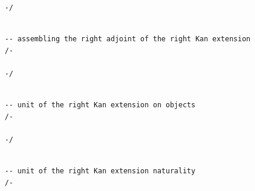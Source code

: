 \documentclass{book}
\theoremstyle{definition}
\newcounter{lcounter}
\begin{document}
{{\begin{center}
\begin{tcolorbox}[width=5in,colback={white},title={\begin{center}\texttt{Lean \thelcounter} \addtocounter{lcounter}{1}  \end{center}},colbacktitle=Blue,coltitle=black]
\begin{verbatim}
-/

\end{verbatim}
\end{tcolorbox}
\end{center}


\begin{center}
\begin{tcolorbox}[width=5in,colback={white},title={\begin{center}\texttt{Lean \thelcounter} \addtocounter{lcounter}{1}  \end{center}},colbacktitle=Blue,coltitle=black]
\begin{verbatim}

-- assembling the right adjoint of the right Kan extension
/-

-/

\end{verbatim}
\end{tcolorbox}
\end{center}

\begin{center}
\begin{tcolorbox}[width=5in,colback={white},title={\begin{center}\texttt{Lean \thelcounter} \addtocounter{lcounter}{1}  \end{center}},colbacktitle=Blue,coltitle=black]
\begin{verbatim}

-- unit of the right Kan extension on objects
/-

-/

\end{verbatim}
\end{tcolorbox}
\end{center}

\begin{center}
\begin{tcolorbox}[width=5in,colback={white},title={\begin{center}\texttt{Lean \thelcounter} \addtocounter{lcounter}{1}  \end{center}},colbacktitle=Blue,coltitle=black]
\begin{verbatim}

-- unit of the right Kan extension naturality
/-


\end{verbatim}
\end{tcolorbox}
\end{center}}}
\end{document}
